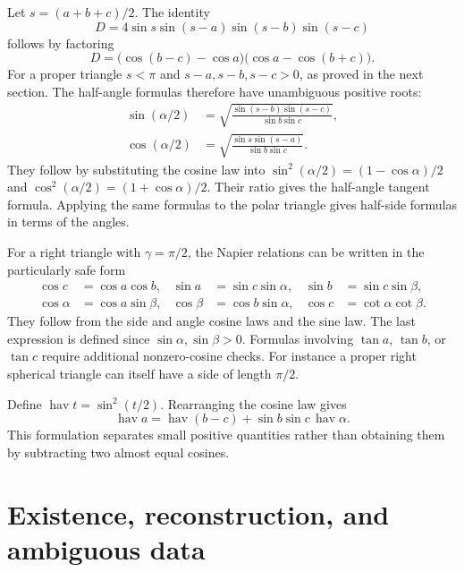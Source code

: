 \documentclass[11pt,letterpaper]{article}
\numberwithin{equation}{section}
\theoremstyle{definition}
\theoremstyle{remark}
\newcommand{\hav}{\operatorname{hav}}
\begin{document}
Let $s=(a+b+c)/2$. The identity
\begin{equation}\label{e3:eq:gramfactor}
 D=4\sin s\sin(s-a)\sin(s-b)\sin(s-c)
\end{equation}
follows by factoring
\[
 D=\bigl(\cos(b-c)-\cos a\bigr)
       \bigl(\cos a-\cos(b+c)\bigr).
\]
For a proper triangle $s<\pi$ and $s-a,s-b,s-c>0$, as proved in the next
section. The half-angle formulas therefore have unambiguous positive roots:
\begin{align}
 \sin(\alpha/2)&=
 \sqrt{\frac{\sin(s-b)\sin(s-c)}{\sin b\sin c}},\label{e3:eq:halfsin}\\
 \cos(\alpha/2)&=
 \sqrt{\frac{\sin s\sin(s-a)}{\sin b\sin c}}.\label{e3:eq:halfcos}
\end{align}
They follow by substituting the cosine law into
$\sin^2(\alpha/2)=(1-\cos\alpha)/2$ and
$\cos^2(\alpha/2)=(1+\cos\alpha)/2$.
Their ratio gives the half-angle tangent formula. Applying the same formulas
to the polar triangle gives half-side formulas in terms of the angles.

For a right triangle with $\gamma=\pi/2$, the Napier relations can be written
in the particularly safe form
\begin{align}
 \cos c&=\cos a\cos b,&
 \sin a&=\sin c\sin\alpha,&
 \sin b&=\sin c\sin\beta,\label{e3:eq:napier1}\\
 \cos\alpha&=\cos a\sin\beta,&
 \cos\beta&=\cos b\sin\alpha,&
 \cos c&=\cot\alpha\cot\beta.\label{e3:eq:napier2}
\end{align}
They follow from the side and angle cosine laws and the sine law. The last
expression is defined since $\sin\alpha,\sin\beta>0$. Formulas involving
$\tan a$, $\tan b$, or $\tan c$ require additional nonzero-cosine checks.
For instance a proper right spherical triangle can itself have a side of
length $\pi/2$.

Define $\hav t=\sin^2(t/2)$. Rearranging the cosine law gives
\begin{equation}\label{e3:eq:haversine}
 \hav a=\hav(b-c)+\sin b\sin c\,\hav\alpha.
\end{equation}
This formulation separates small positive quantities rather than obtaining
them by subtracting two almost equal cosines.

\section{Existence, reconstruction, and ambiguous data}\label{e3:sec:reconstruction}
\end{document}
